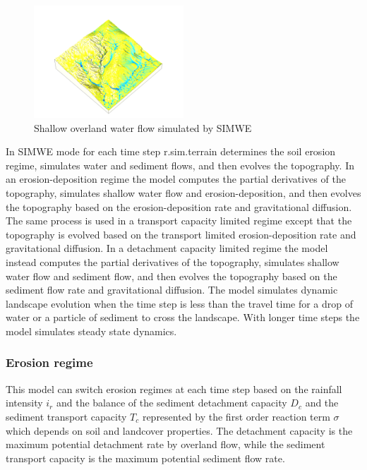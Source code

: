 \documentclass[esurf, manuscript]{copernicus}
\begin{document}
\begin{figure}[h]
\includegraphics[width=0.5\textwidth]{../images/sample_data_3d/depth_2016.png}
\caption{Shallow overland water flow simulated by SIMWE}
\label{fig:3d}
\end{figure}

In SIMWE mode 
for each time step
\lowercase{r.sim.terrain}
determines the soil erosion regime,
simulates water and sediment flows, 
and then evolves the topography. 
In an erosion-deposition regime 
the model 
computes the partial derivatives of the topography,
simulates shallow water flow and erosion-deposition,
and then evolves the topography based on the erosion-deposition rate
and gravitational diffusion.
The same process is used in
a transport capacity limited regime
except that the topography is evolved based on 
the transport limited erosion-deposition rate
and gravitational diffusion.
In a detachment capacity limited regime
the model instead
computes the partial derivatives of the topography,
simulates shallow water flow and sediment flow,
and then evolves the topography based on the sediment flow rate
and gravitational diffusion.
The model simulates dynamic landscape evolution 
when the time step is less than the travel time 
for a drop of water or a particle of sediment to cross the landscape.
With longer time steps the model simulates steady state dynamics. 

\subsubsection{Erosion regime}
This model can switch erosion regimes at each time step
based on the rainfall intensity $i_r$
and the balance of the sediment detachment capacity $D_c$
and the sediment transport capacity $T_c$
represented by the first order reaction term $\sigma$ 
which depends on soil and landcover properties.
The detachment capacity is the maximum potential detachment rate by overland flow, while
the sediment transport capacity is the maximum potential sediment flow rate.
\end{document}
